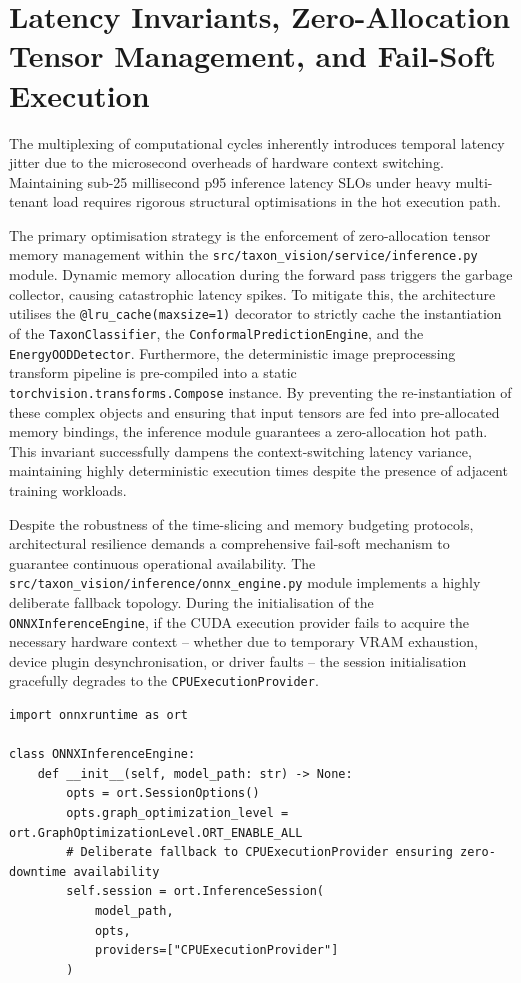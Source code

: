 \section{Latency Invariants, Zero-Allocation Tensor Management, and Fail-Soft Execution}
\label{sec:latency_invariants}

The multiplexing of computational cycles inherently introduces temporal latency jitter due to the microsecond overheads of hardware context switching. Maintaining sub-25 millisecond p95 inference latency SLOs under heavy multi-tenant load requires rigorous structural optimisations in the hot execution path.

The primary optimisation strategy is the enforcement of zero-allocation tensor memory management within the \texttt{src/taxon\_vision/service/inference.py} module. Dynamic memory allocation during the forward pass triggers the garbage collector, causing catastrophic latency spikes. To mitigate this, the architecture utilises the \texttt{@lru\_cache(maxsize=1)} decorator to strictly cache the instantiation of the \texttt{TaxonClassifier}, the \texttt{ConformalPredictionEngine}, and the \texttt{EnergyOODDetector}. Furthermore, the deterministic image preprocessing transform pipeline is pre-compiled into a static \texttt{torchvision.transforms.Compose} instance. By preventing the re-instantiation of these complex objects and ensuring that input tensors are fed into pre-allocated memory bindings, the inference module guarantees a zero-allocation hot path. This invariant successfully dampens the context-switching latency variance, maintaining highly deterministic execution times despite the presence of adjacent training workloads.

Despite the robustness of the time-slicing and memory budgeting protocols, architectural resilience demands a comprehensive fail-soft mechanism to guarantee continuous operational availability. The \texttt{src/taxon\_vision/inference/onnx\_engine.py} module implements a highly deliberate fallback topology. During the initialisation of the \texttt{ONNXInferenceEngine}, if the CUDA execution provider fails to acquire the necessary hardware context -- whether due to temporary VRAM exhaustion, device plugin desynchronisation, or driver faults -- the session initialisation gracefully degrades to the \texttt{CPUExecutionProvider}.

\begin{listing}[H]
\begin{verbatim}
import onnxruntime as ort

class ONNXInferenceEngine:
    def __init__(self, model_path: str) -> None:
        opts = ort.SessionOptions()
        opts.graph_optimization_level = ort.GraphOptimizationLevel.ORT_ENABLE_ALL
        # Deliberate fallback to CPUExecutionProvider ensuring zero-downtime availability
        self.session = ort.InferenceSession(
            model_path,
            opts,
            providers=["CPUExecutionProvider"]
        )
\end{verbatim}
\caption{ONNX Runtime engine instantiation demonstrating the fail-soft fallback configuration.}
\label{lst:onnx_cpu_fallback}
\end{listing}

